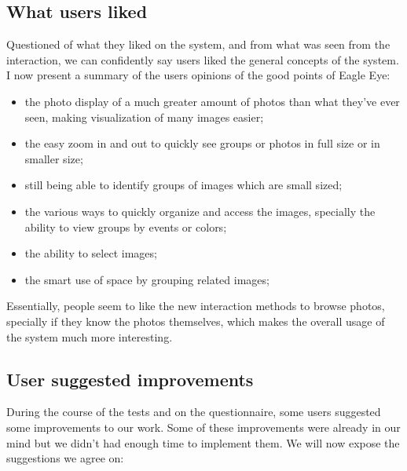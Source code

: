 \subsection{What users liked}

Questioned of what they liked on the system, and from what was seen from the interaction, we can confidently say users liked the general concepts of the system. I now present a summary of the users opinions of the good points of Eagle Eye:
\begin{itemize}
\item the photo display of a much greater amount of photos than what they've ever seen, making visualization of many images easier;
\item the easy zoom in and out to quickly see groups or photos in full size or in smaller size;
\item still being able to identify groups of images which are small sized;
\item the various ways to quickly organize and access the images, specially the ability to view groups by events or colors;
\item the ability to select images;
\item the smart use of space by grouping related images;
\end{itemize}

Essentially, people seem to like the new interaction methods to browse photos, specially if they know the photos themselves, which makes the overall usage of the system much more interesting.

\subsection{User suggested improvements}

During the course of the tests and on the questionnaire, some users suggested some improvements to our work. Some of these improvements were already in our mind but we didn't had enough time to implement them. We will now expose the suggestions we agree on:


